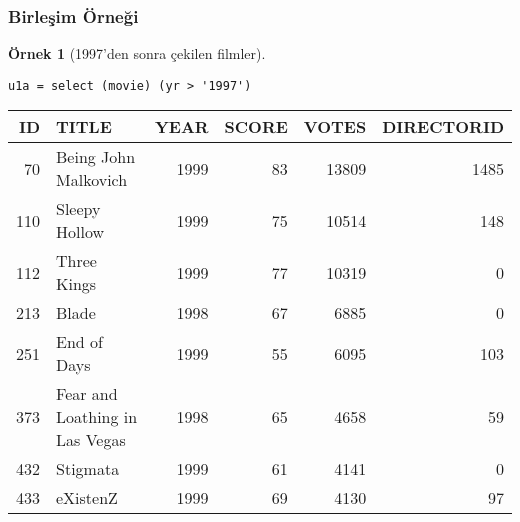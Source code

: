 \documentclass[dvipsnames]{beamer}
\theoremstyle{definition}
\theoremstyle{example}
\newtheorem{ornek}[theorem]{Örnek}
\theoremstyle{plain}
\begin{document}
\begin{frame}[fragile]
  \frametitle{Birleşim Örneği}

  \begin{ornek}[1997'den sonra çekilen filmler]
    \begin{lstlisting}
u1a = select (movie) (yr > '1997')
    \end{lstlisting}

    \pause
    \begin{tiny}
    \begin{table}
      \begin{tabular}{|r|l|r|r|r|r|}\hline
 ID & TITLE                          & YEAR & SCORE & VOTES & DIRECTORID\\\hline\hline
 70 & Being John Malkovich           & 1999 &    83 & 13809 &       1485\\\hline
110 & Sleepy Hollow                  & 1999 &    75 & 10514 &        148\\\hline
112 & Three Kings                    & 1999 &    77 & 10319 &          0\\\hline
213 & Blade                          & 1998 &    67 &  6885 &          0\\\hline
251 & End of Days                    & 1999 &    55 &  6095 &        103\\\hline
373 & Fear and Loathing in Las Vegas & 1998 &    65 &  4658 &         59\\\hline
432 & Stigmata                       & 1999 &    61 &  4141 &          0\\\hline
433 & eXistenZ                       & 1999 &    69 &  4130 &         97\\\hline
      \end{tabular}
    \end{table}
    \end{tiny}
  \end{ornek}
\end{frame}
\end{document}
